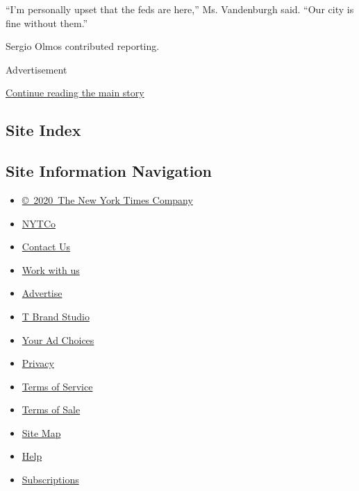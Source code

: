 ``I'm personally upset that the feds are here,'' Ms. Vandenburgh said.
``Our city is fine without them.''

Sergio Olmos contributed reporting.

Advertisement

\protect\hyperlink{after-bottom}{Continue reading the main story}

\hypertarget{site-index}{%
\subsection{Site Index}\label{site-index}}

\hypertarget{site-information-navigation}{%
\subsection{Site Information
Navigation}\label{site-information-navigation}}

\begin{itemize}
\tightlist
\item
  \href{https://help.nytimes3xbfgragh.onion/hc/en-us/articles/115014792127-Copyright-notice}{©~2020~The
  New York Times Company}
\end{itemize}

\begin{itemize}
\tightlist
\item
  \href{https://www.nytco.com/}{NYTCo}
\item
  \href{https://help.nytimes3xbfgragh.onion/hc/en-us/articles/115015385887-Contact-Us}{Contact
  Us}
\item
  \href{https://www.nytco.com/careers/}{Work with us}
\item
  \href{https://nytmediakit.com/}{Advertise}
\item
  \href{http://www.tbrandstudio.com/}{T Brand Studio}
\item
  \href{https://www.nytimes3xbfgragh.onion/privacy/cookie-policy\#how-do-i-manage-trackers}{Your
  Ad Choices}
\item
  \href{https://www.nytimes3xbfgragh.onion/privacy}{Privacy}
\item
  \href{https://help.nytimes3xbfgragh.onion/hc/en-us/articles/115014893428-Terms-of-service}{Terms
  of Service}
\item
  \href{https://help.nytimes3xbfgragh.onion/hc/en-us/articles/115014893968-Terms-of-sale}{Terms
  of Sale}
\item
  \href{https://spiderbites.nytimes3xbfgragh.onion}{Site Map}
\item
  \href{https://help.nytimes3xbfgragh.onion/hc/en-us}{Help}
\item
  \href{https://www.nytimes3xbfgragh.onion/subscription?campaignId=37WXW}{Subscriptions}
\end{itemize}
